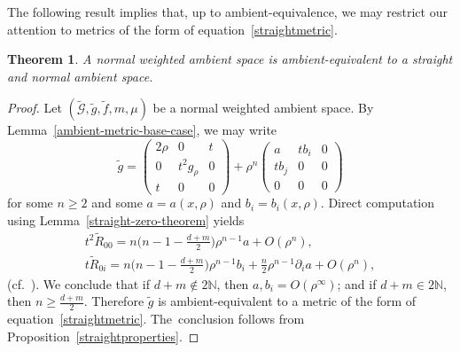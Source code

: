 \documentclass[10pt,a4paper]{amsart}
\numberwithin{equation}{section}
\newtheorem{Theorem}{Theorem}[section]
\begin{document}
The following result implies that, up to ambient-equivalence, we may restrict our attention to metrics of the form of equation~\eqref{straightmetric}.
\begin{Theorem}
\label{normal-to-straight-and-normal}
A normal weighted ambient space is ambient-equivalent to a straight and normal ambient space.
\end{Theorem}
\begin{proof}
Let $(\widetilde{\mathcal{G}},\widetilde{g},\widetilde{f},m,\mu)$ be a normal weighted ambient space. By Lemma~\ref{ambient-metric-base-case}, we may write
\[
\widetilde{g}=\begin{pmatrix} 2\rho&0&t\\0&t^2 g_\rho& 0\\ t&0&0\end{pmatrix}+\rho^n \begin{pmatrix} a& tb_i& 0\\ tb_j & 0 & 0\\ 0&0&0\end{pmatrix}
\]
for some $n\geq 2$ and some $a=a(x,\rho)$ and $b_i=b_i(x,\rho)$. Direct computation using Lemma~\ref{straight-zero-theorem} yields
\begin{gather*}
t^{2} \widetilde{R}_{00}=n\bigg(n-1-\frac{d+m}{2}\bigg) \rho^{n-1} a+O(\rho^{n}),
\\
t \widetilde{R}_{0 i}=n\bigg(n-1-\frac{d+m}{2}\bigg) \rho^{n-1} b_i+\frac{n}{2} \rho^{n-1} \partial_{i} a+O(\rho^{n}),
\end{gather*}
(cf.\ \cite[equation~(3.11)]{FeffermanGraham2012}).
We conclude that if $d+m\notin 2\mathbb{N}$, then $a,b_i=O(\rho^\infty)$; and if $d+m\in 2\mathbb{N}$, then $n\geq \frac{d+m}{2}$. Therefore $\widetilde{g}$ is ambient-equivalent to a metric of the form of equation~\eqref{straightmetric}. The~conclusion follows from Proposition~\ref{straightproperties}.
\end{proof}
\end{document}
